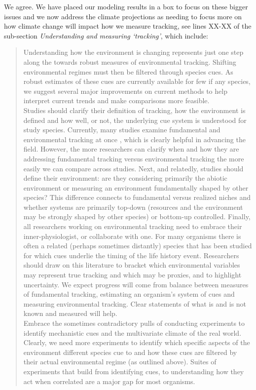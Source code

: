 \documentclass[11pt]{article}
\begin{document}
We agree. We have placed our modeling results in a box to focus on these bigger issues and we now address the climate projections as needing to focus more on how climate change will impact how we measure tracking, see lines XX-XX of the sub-section \emph{Understanding and measuring `tracking'}, which include:
\begin{quote}
Understanding how the environment is changing represents just one step along the towards robust measures of environmental tracking. Shifting environmental regimes must then be filtered through species cues. As robust estimates of these cues are currently available for few if any species, we suggest several major improvements on current methods to help interpret current trends and make comparisons more feasible. \\

Studies should clarify their definition of tracking, how the environment is defined and how well, or not, the underlying cue system is understood for study species. Currently, many studies examine fundamental and environmental tracking at once \citep[e.g.,][]{yang2020}, which is clearly helpful in advancing the field. However, the more researchers can clarify when and how they are addressing fundamental tracking versus environmental tracking the more easily we can compare across studies. Next, and relatedly, studies should define their environment: are they considering primarily the abiotic environment or measuring an environment fundamentally shaped by other species? This difference connects to fundamental versus realized niches and  whether systems are primarily top-down (resources and the environment may be strongly shaped by other species) or bottom-up controlled. Finally, all researchers working on environmental tracking need to embrace their inner-physiologist, or collaborate with one. For many organisms there is often a related (perhaps sometimes distantly) species that has been studied for which cues underlie the timing of the life history event. Researchers should draw on this literature to bracket which environmental variables may represent true tracking and which may be proxies, and to highlight uncertainty. We expect progress will come from balance between measures of fundamental tracking, estimating an organism's system of cues and measuring environmental tracking. Clear statements of what is and is not known and measured will help. \\

Embrace the sometimes contradictory pulls of conducting experiments to identify mechanistic cues and the multivariate climate of the real world. Clearly, we need more experiments to identify which specific aspects of the environment different species cue to and how these cues are filtered by their actual environmental regime (as outlined above). Suites of experiments that build from identifying cues, to understanding how they act when correlated are a major gap for most organisms. 
\end{quote}
\end{document}
